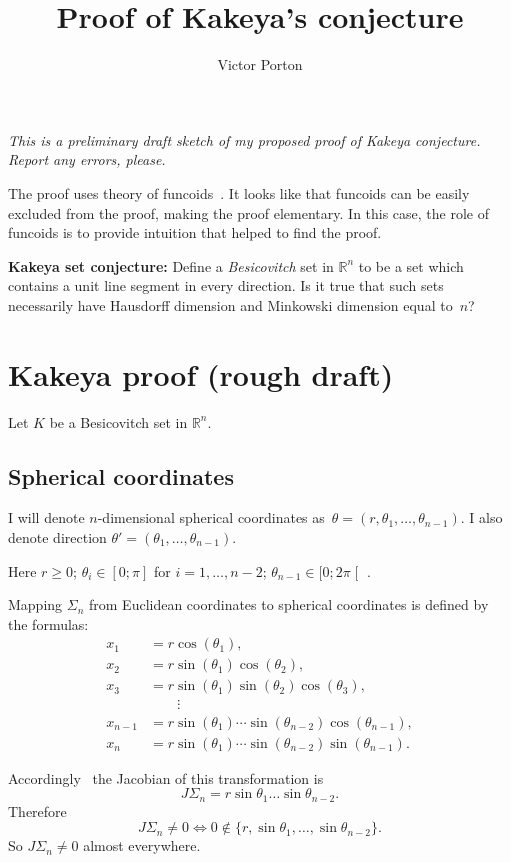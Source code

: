 \documentclass{amsart}
\title{Proof of Kakeya's conjecture}
\author{Victor Porton}
\begin{document}
\maketitle  

\emph{This is a preliminary draft sketch of my proposed proof of Kakeya conjecture. Report any errors, please.}

The proof uses theory of funcoids~\cite{volume-1}. It looks like that funcoids can be easily excluded from the proof, making the proof elementary. In this case, the role of funcoids is to provide intuition that helped to find the proof.

\textbf{Kakeya set conjecture:} Define a \emph{Besicovitch} set in $\mathbb{R}^n$ to be a set which contains a unit line segment in every direction. Is it true that such sets necessarily have Hausdorff dimension and Minkowski dimension equal to~$n$?

\section{Kakeya proof (rough draft)}

Let $K$ be a Besicovitch set in $\mathbb{R}^n$.

\subsection{Spherical coordinates}

I will denote $n$-dimensional spherical coordinates as~$\theta=(r, \theta_1,\dots,\theta_{n-1})$.
I also denote direction $\theta'=(\theta_1,\dots,\theta_{n-1})$.

Here $r\geq 0$; $\theta_i\in[0;\pi]$ for $i=1,\dots,n-2$; $\theta_{n-1}\in[0;2\pi\mathclose[$ .

Mapping $\Sigma_n$ from Euclidean coordinates to spherical coordinates is defined by the formulas:
\[
\begin{aligned}x_{1}&=r\cos(\theta _{1}),\\x_{2}&=r\sin(\theta _{1})\cos(\theta _{2}),\\x_{3}&=r\sin(\theta _{1})\sin(\theta _{2})\cos(\theta _{3}),\\&\qquad \vdots \\x_{n-1}&=r\sin(\theta _{1})\cdots \sin(\theta _{n-2})\cos(\theta _{n-1}),\\x_{n}&=r\sin(\theta _{1})\cdots \sin(\theta _{n-2})\sin(\theta _{n-1}).\end{aligned}
\]

Accordingly~\cite{polar-jacobian} the Jacobian of this transformation is
\[ J\Sigma_n = r\sin\theta_1\dots\sin\theta_{n-2}. \]
Therefore
\[
J\Sigma_n\ne 0\Leftrightarrow 0\notin\{r,\sin\theta_1,\dots,\sin\theta_{n-2}\}.
\]
So $J\Sigma_n\ne 0$ almost everywhere.
\end{document}
